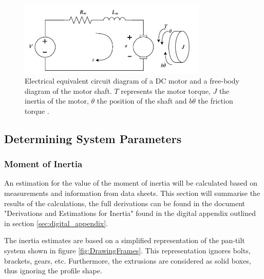 \documentclass[../../main.tex]{subfiles}
\begin{document}
\begin{figure}[H]
    \centering
    \includegraphics[width=0.8\textwidth]{Sections/System_Modelling/Images/motor_armaturer_REAL.pdf}
    \caption{Electrical equivalent circuit diagram of a DC motor and a free-body diagram of the motor shaft. $T$ represents the motor torque, $J$ the inertia of the motor, $\theta$ the position of the shaft and $b\dot{\theta}$ the friction torque \cite{universityofmichigan2019}.}
    \label{fig:Armature_Circuit}
\end{figure}




\subsection{Determining System Parameters}\label{subsec:motorParameters}
\subsubsection*{Moment of Inertia}
An estimation for the value of the moment of inertia will be calculated based on measurements and information from data sheets. This section will summarise the results of the calculations, the full derivations can be found in the document "Derivations and Estimations for Inertia" found in the digital appendix outlined in section \ref{sec:digital_appendix}.



The inertia estimates are based on a simplified representation of the pan-tilt system shown in figure \ref{fig:DrawingFrames}. This representation ignores bolts, brackets, gears, etc. Furthermore, the extrusions are considered as solid boxes, thus ignoring the profile shape.
\end{document}
